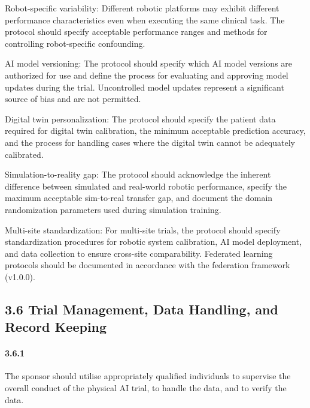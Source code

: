 \begin{description}[leftmargin=2.5cm,style=sameline]

\item[(a)] Robot-specific variability: Different robotic platforms may exhibit different performance characteristics even when executing the same clinical task. The protocol should specify acceptable performance ranges and methods for controlling robot-specific confounding.

\item[(b)] AI model versioning: The protocol should specify which AI model versions are authorized for use and define the process for evaluating and approving model updates during the trial. Uncontrolled model updates represent a significant source of bias and are not permitted.

\item[(c)] Digital twin personalization: The protocol should specify the patient data required for digital twin calibration, the minimum acceptable prediction accuracy, and the process for handling cases where the digital twin cannot be adequately calibrated.

\item[(d)] Simulation-to-reality gap: The protocol should acknowledge the inherent difference between simulated and real-world robotic performance, specify the maximum acceptable sim-to-real transfer gap, and document the domain randomization parameters used during simulation training.

\item[(e)] Multi-site standardization: For multi-site trials, the protocol should specify standardization procedures for robotic system calibration, AI model deployment, and data collection to ensure cross-site comparability. Federated learning protocols should be documented in accordance with the federation framework (v1.0.0).

\end{description}

\subsection{3.6 Trial Management, Data Handling, and Record Keeping}

\paragraph{3.6.1} The sponsor should utilise appropriately qualified individuals to supervise the overall conduct of the physical AI trial, to handle the data, and to verify the data.

